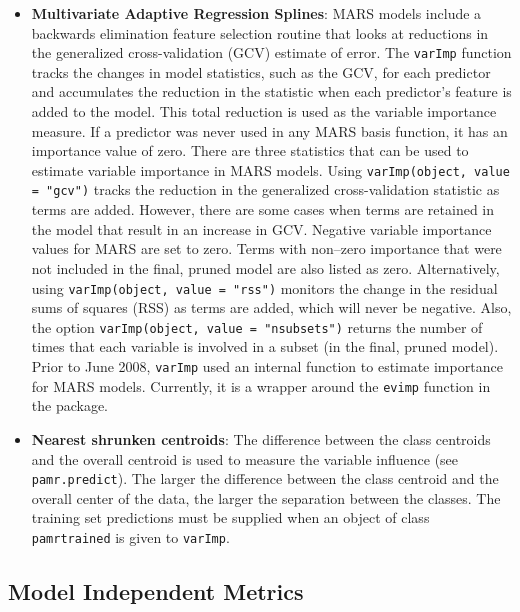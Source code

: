\documentclass[12pt]{article}
\begin{document}
\begin{itemize}
  \item {\bf Multivariate Adaptive Regression Splines}: MARS models 
        include a backwards elimination feature selection routine that
        looks at reductions in the generalized cross-validation (GCV)
        estimate of error. The \texttt{varImp} function tracks the changes in
        model statistics, such as the GCV, for each predictor and
        accumulates the reduction in the statistic when each
        predictor's feature is added to the model. This total reduction
        is used as the variable importance measure. If a predictor was
        never used in any MARS basis function, it has an importance
        value of zero. There are three statistics that can be used to
        estimate variable importance in MARS models. Using
        \texttt{varImp(object, value = "gcv")} tracks the reduction in the
        generalized cross-validation statistic as terms are added.
        However, there are some cases when terms are retained 
        in the model that result in an increase in GCV. Negative variable 
        importance values for MARS are set to zero. Terms with non--zero importance that were not included
        in the final, pruned model are also listed as zero. 
        Alternatively, using
        \texttt{varImp(object, value = "rss")} monitors the change in the
        residual sums of squares (RSS) as terms are added, which will
        never be negative. 
        Also, the option \texttt{varImp(object, value = "nsubsets")} 
        returns the number of times that each variable is involved in a subset (in the final, pruned model).  
        Prior to June 2008, \texttt{varImp} used an internal function to estimate
        importance for MARS models. Currently, it is a wrapper around the 
       \texttt{evimp} function in the  package.
   
  \item {\bf Nearest shrunken centroids}: The difference between the class
        centroids and the overall centroid is used to measure the
        variable influence (see \texttt{pamr.predict}). The larger the
        difference between   the class centroid and the overall center
        of the data, the larger the separation between the classes. The
        training set predictions must be supplied when an object of
        class \texttt{pamrtrained} is given to \texttt{varImp}. 

\end{itemize}   

\subsection{Model Independent Metrics}
\end{document}
